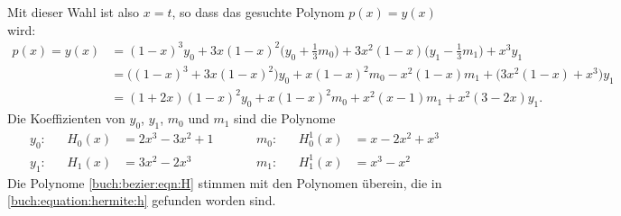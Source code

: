 Mit dieser Wahl ist also $x=t$, so dass das gesuchte Polynom $p(x)=y(x)$ wird:
\begin{align*}
p(x)
=
y(x)
&=
(1-x)^3 y_0
+
3x(1-x)^2\biggl(y_0+\frac13m_0\biggr)
+
3x^2(1-x) \biggl(y_1-\frac13m_1\biggr)
+
x^3 y_1
\\
&=
\bigl((1-x)^3+3x(1-x)^2\bigr)
y_0
+
x(1-x)^2 m_0
-
x^2(1-x) m_1
+
\bigl(3x^2(1-x)+x^3\bigr)
y_1
\\
&=
(1+2x)(1-x)^2 y_0
+
x(1-x)^2 m_0
+
x^2(x-1) m_1
+
x^2(3-2x) y_1.
\end{align*}
Die Koeffizienten von $y_0$, $y_1$, $m_0$ und $m_1$ sind die Polynome
\begin{equation}
\begin{aligned}
y_0:&&
H_0(x)
&=
2x^3-3x^2+1
&\quad&
&m_0:&&
H_0^1(x)
&=
x-2x^2+x^3
\\
y_1:&&
H_1(x)
&=
3x^2-2x^3
&\quad&
&m_1:&&
H_1^1(x)
&=
x^3-x^2
\end{aligned}
\label{buch:bezier:eqn:H}
\end{equation}
Die Polynome \eqref{buch:bezier:eqn:H} stimmen mit den Polynomen überein,
die in \eqref{buch:equation:hermite:h} gefunden worden sind.

%
%
